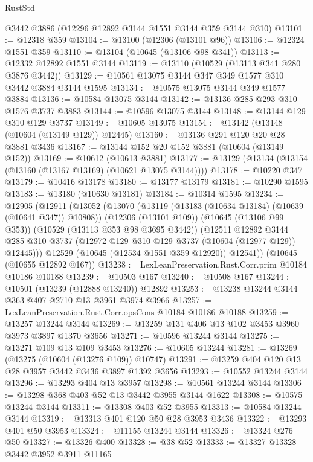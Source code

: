 \begin{lexlean}{RustStd}
\begin{coremodule}
    @3442
    @3886
    (@12296 @12892 @3144 @1551 @3144 @359 @3144 @310)
@13101 := @12318 @359
@13104 := @13100 (@12306 (@13101 @96))
@13106 := @12324 @1551 @359
@13110 := @13104 (@10645 (@13106 @98 @341))
@13113 := @12332 @12892 @1551 @3144
@13119 := @13110 (@10529 (@13113 @341 @280 @3876 @3442))
@13129 := @10561 @13075 @3144 @347 @349 @1577 @310 @3442 @3884 @3144 @1595
@13134 := @10575 @13075 @3144 @349 @1577 @3884
@13136 := @10584 @13075 @3144
@13142 := @13136 @285 @293 @310 @1576 @3737 @3883
@13144 := @10596 @13075 @3144
@13148 := @13144 @129 @310 @129 @3737
@13149 := @10605 @13075
@13154 := @13142 (@13148 (@10604 (@13149 @129)) @12445)
@13160 := @13136 @291 @120 @20 @28 @3881 @3436
@13167 := @13144 @152 @20 @152 @3881 (@10604 (@13149 @152))
@13169 := @10612 (@10613 @3881)
@13177 := @13129 (@13134 (@13154 (@13160 (@13167 @13169) (@10621 @13075 @3144))))
@13178 := @10220 @347
@13179 := @10416 @13178
@13180 := @13177 @13179
@13181 := @10290 @1595
@13183 := @13180 (@10630 @13181)
@13184 := @10314 @1595
@13234 := @12905
    (@12911
      (@13052
        (@13070
          (@13119 (@13183 (@10634 @13184) (@10639 (@10641 @347)) @10808))
          (@12306 (@13101 @109))
          (@10645 (@13106 @99 @353))
          (@10529 (@13113 @353 @98 @3695 @3442))
          (@12511
            @12892
            @3144
            @285
            @310
            @3737
            (@12972 @129 @310 @129 @3737 (@10604 (@12977 @129)) @12445)))
        @12529
        (@10645 (@12534 @1551 @359 @12920))
        @12541))
    (@10645 (@10655 @12892 @167))
@13238 := LexLeanPreservation.Rust.Corr.prim @10184 @10186 @10188
@13239 := @10503 @167
@13240 := @10508 @167
@13244 := @10501 (@13239 (@12888 @13240)) @12892
@13253 := @13238 @13244 @3144 @363 @407 @2710 @13 @3961 @3974 @3966
@13257 := LexLeanPreservation.Rust.Corr.opsCons @10184 @10186 @10188
@13259 := @13257 @13244 @3144
@13269 := @13259 @131 @406 @13 @102 @3453 @3960 @3973 @3897 @1370 @3656
@13271 := @10596 @13244 @3144
@13275 := @13271 @109 @13 @109 @3453
@13276 := @10605 @13244
@13281 := @13269 (@13275 (@10604 (@13276 @109)) @10747)
@13291 := @13259 @404 @120 @13 @28 @3957 @3442 @3436 @3897 @1392 @3656
@13293 := @10552 @13244 @3144
@13296 := @13293 @404 @13 @3957
@13298 := @10561 @13244 @3144
@13306 := @13298 @368 @403 @52 @13 @3442 @3955 @3144 @1622
@13308 := @10575 @13244 @3144
@13311 := @13308 @403 @52 @3955
@13313 := @10584 @13244 @3144
@13319 := @13313 @401 @120 @50 @28 @3953 @3436
@13322 := @13293 @401 @50 @3953
@13324 := @11155 @13244 @3144
@13326 := @13324 @276 @50
@13327 := @13326 @400
@13328 := @38 @52
@13333 := @13327 @13328 @3442 @3952 @3911 @11165

\end{coremodule}
\end{lexlean}
